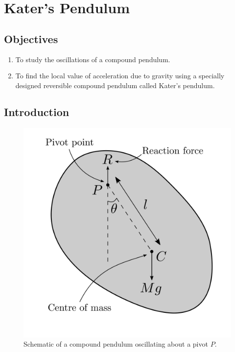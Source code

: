\chapter{Kater's Pendulum}

\section*{Objectives}

\begin{enumerate}
\itemsep0em
\item To study the oscillations of a compound pendulum.
\item To find the local value of acceleration due to gravity using a specially designed reversible compound pendulum called Kater's pendulum.  
\end{enumerate}



\section*{Introduction}

\begin{figure}[!htb]
        \centering
        \includegraphics[scale=0.55]{figs/katers-pendulum/compoundPendulum.png}
        \caption{Schematic of a compound pendulum oscillating about a pivot $P$.}
\end{figure}

